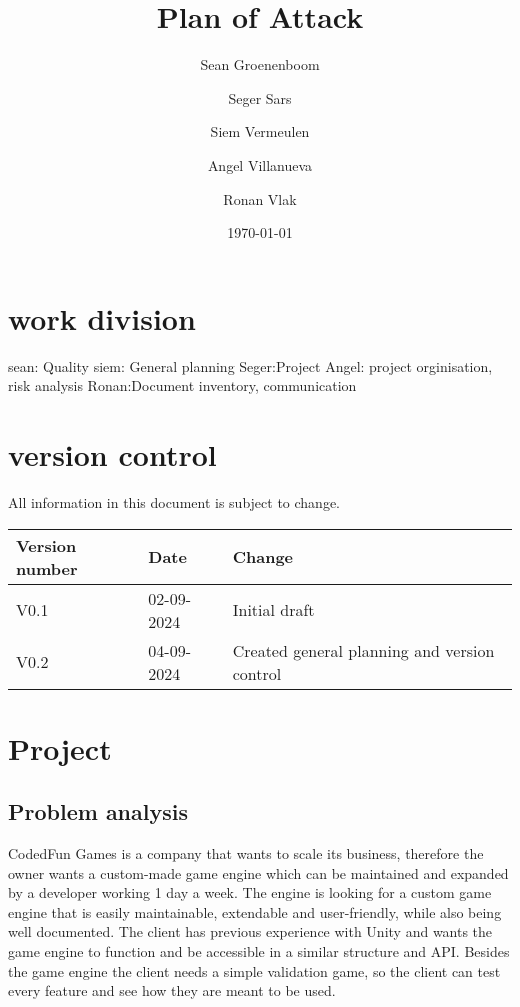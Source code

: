 \documentclass{article} %
\title{Plan of Attack} %
\author{Sean Groenenboom \and Seger Sars \and Siem Vermeulen \and Angel Villanueva \and Ronan Vlak} %
\date{\today} %
\begin{document}
    \maketitle %
    \newpage

    \tableofcontents %
    \newpage

    \section{work division}
    sean: Quality
    siem: General planning
    Seger:Project
    Angel: project orginisation, risk analysis
    Ronan:Document inventory, communication
    \newpage

    \section{version control}
    All information in this document is subject to change. \\
    \begin{tabularx}{\textwidth}{|X|X|X|}
        \hline
        \textbf{Version number} & \textbf{Date} & \textbf{Change} \\ \hline
        V0.1 & 02-09-2024 & Initial draft \\ \hline
        V0.2 & 04-09-2024 & Created general planning and version control \\ \hline
        \end{tabularx}
    \newpage
            
    \section{Project}
    \subsection{Problem analysis}
    CodedFun Games is a company that wants to scale its business, therefore
    the owner wants a custom-made game engine which can be maintained and expanded by a developer working 1 day a week.
    The engine is looking for a custom game engine that is easily maintainable, extendable and user-friendly, while also being well documented.
    The client has previous experience with Unity and wants the game engine to function and be accessible in a similar structure and API.
    \newline \newline
    Besides the game engine the client needs a simple validation game, so the client can test every feature and see how they are meant to be used.
\end{document}
